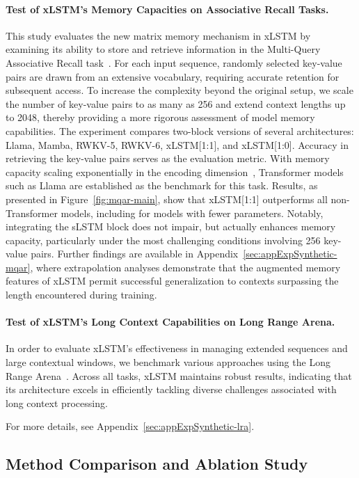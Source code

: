 \paragraph{Test of xLSTM's Memory Capacities on Associative Recall Tasks.} This study evaluates the new matrix memory mechanism in xLSTM by examining its ability to store and retrieve information in the Multi-Query Associative Recall task~\citep{Arora:23arxiv}. For each input sequence, randomly selected key-value pairs are drawn from an extensive vocabulary, requiring accurate retention for subsequent access. To increase the complexity beyond the original setup, we scale the number of key-value pairs to as many as 256 and extend context lengths up to 2048, thereby providing a more rigorous assessment of model memory capabilities. The experiment compares two-block versions of several architectures: Llama, Mamba, RWKV-5, RWKV-6, xLSTM[1:1], and xLSTM[1:0]. Accuracy in retrieving the key-value pairs serves as the evaluation metric. With memory capacity scaling exponentially in the encoding dimension~\citep{Ramsauer:21}, Transformer models such as Llama are established as the benchmark for this task. Results, as presented in Figure~\ref{fig:mqar-main}, show that xLSTM[1:1] outperforms all non-Transformer models, including for models with fewer parameters. Notably, integrating the sLSTM block does not impair, but actually enhances memory capacity, particularly under the most challenging conditions involving 256 key-value pairs. Further findings are available in Appendix~\ref{sec:appExpSynthetic-mqar}, where extrapolation analyses demonstrate that the augmented memory features of xLSTM permit successful generalization to contexts surpassing the length encountered during training.

\paragraph{Test of xLSTM's Long Context Capabilities on Long Range Arena.} In order to evaluate xLSTM's effectiveness in managing extended sequences and large contextual windows, we benchmark various approaches using the Long Range Arena~\citep{Tay:21}. Across all tasks, xLSTM maintains robust results, indicating that its architecture excels in efficiently tackling diverse challenges associated with long context processing.

For more details, see Appendix~\ref{sec:appExpSynthetic-lra}.

\subsection{Method Comparison and Ablation Study}
\label{sec:ExpComparison}

